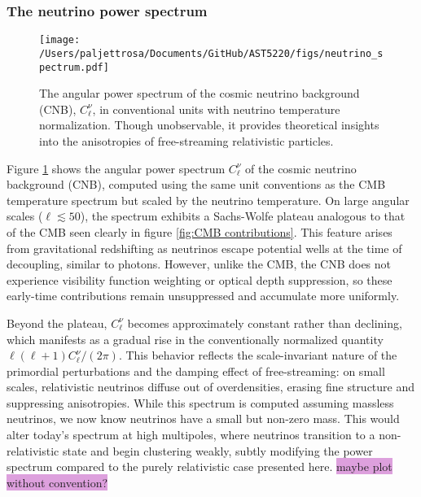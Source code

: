 \documentclass{aa}
\numberwithin{equation}{section}
\numberwithin{table}{section}
\numberwithin{figure}{section}
\begin{document}




\subsubsection{The neutrino power spectrum}

\begin{figure}
\centering
\texttt{[image: /Users/paljettrosa/Documents/GitHub/AST5220/figs/neutrino\_spectrum.pdf]}
\caption{The angular power spectrum of the cosmic neutrino background (CNB), $C_\ell^\nu$, in conventional units with neutrino temperature normalization. Though unobservable, it provides theoretical insights into the anisotropies of free-streaming relativistic particles.}\label{fig:neutrino spectrum}
\end{figure}

Figure \ref{fig:neutrino spectrum} shows the angular power spectrum $C_\ell^\nu$ of the cosmic neutrino background (CNB), computed using the same unit conventions as the CMB temperature spectrum but scaled by the neutrino temperature. On large angular scales ($\ell \lesssim 50$), the spectrum exhibits a Sachs-Wolfe plateau analogous to that of the CMB seen clearly in figure \ref{fig:CMB contributions}. This feature arises from gravitational redshifting as neutrinos escape potential wells at the time of decoupling, similar to photons. However, unlike the CMB, the CNB does not experience visibility function weighting or optical depth suppression, so these early-time contributions remain unsuppressed and accumulate more uniformly.

Beyond the plateau, $C_\ell^\nu$ becomes approximately constant rather than declining, which manifests as a gradual rise in the conventionally normalized quantity $\ell(\ell+1)C_\ell^\nu / (2\pi)$. This behavior reflects the scale-invariant nature of the primordial perturbations and the damping effect of free-streaming: on small scales, relativistic neutrinos diffuse out of overdensities, erasing fine structure and suppressing anisotropies. While this spectrum is computed assuming massless neutrinos, we now know neutrinos have a small but non-zero mass. This would alter today's spectrum at high multipoles, where neutrinos transition to a non-relativistic state and begin clustering weakly, subtly modifying the power spectrum compared to the purely relativistic case presented here. \colorbox{Plum}{maybe plot without convention?}
\end{document}

